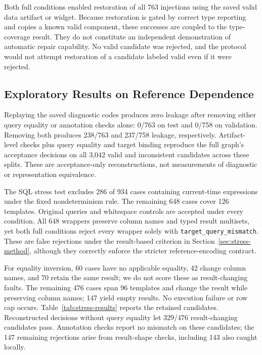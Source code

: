 \documentclass[manuscript,review,anonymous]{acmart}
\begin{document}
Both full conditions enabled restoration of all 763 injections using the saved valid data artifact or widget. Because restoration is gated by correct type reporting and copies a known valid component, these successes are coupled to the type-coverage result. They do not constitute an independent demonstration of automatic repair capability. No valid candidate was rejected, and the protocol would not attempt restoration of a candidate labeled valid even if it were rejected.

\subsection{Exploratory Results on Reference Dependence}
\label{sec:stress-results}

Replaying the saved diagnostic codes produces zero leakage after removing either query equality or annotation checks alone: 0/763 on test and 0/758 on validation. Removing both produces 238/763 and 237/758 leakage, respectively. Artifact-level checks plus query equality and target binding reproduce the full graph's acceptance decisions on all 3,042 valid and inconsistent candidates across these splits. These are acceptance-only reconstructions, not measurements of diagnostic or representation equivalence.

The SQL stress test excludes 286 of 934 cases containing current-time expressions under the fixed nondeterminism rule. The remaining 648 cases cover 126 templates. Original queries and whitespace controls are accepted under every condition. All 648 wrappers preserve column names and typed result multisets, yet both full conditions reject every wrapper solely with \texttt{target\_query\_mismatch}. These are false rejections under the result-based criterion in Section~\ref{sec:stress-method}, although they correctly enforce the stricter reference-encoding contract.

For equality inversion, 60 cases have no applicable equality, 42 change column names, and 70 retain the same result; we do not score these as result-changing faults. The remaining 476 cases span 96 templates and change the result while preserving column names; 147 yield empty results. No execution failure or row cap occurs. Table~\ref{tab:stress-results} reports the retained candidates. Reconstructed decisions without query equality let 329/476 result-changing candidates pass. Annotation checks report no mismatch on these candidates; the 147 remaining rejections arise from result-shape checks, including 143 also caught locally.
\end{document}
